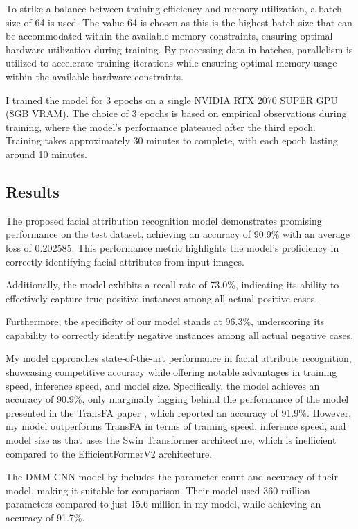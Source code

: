 \documentclass[a4paper,oneside]{article}
\begin{document}
To strike a balance between training efficiency and memory utilization, a batch size of 64 is used.
The value 64 is chosen as this is the highest batch size that can be accommodated within the available memory constraints, ensuring optimal hardware utilization during training.
By processing data in batches, parallelism is utilized to accelerate training iterations while ensuring optimal memory usage within the available hardware constraints.

I trained the model for 3 epochs on a single NVIDIA RTX 2070 SUPER GPU (8GB VRAM).
The choice of 3 epochs is based on empirical observations during training, where the model's performance plateaued after the third epoch.
Training takes approximately 30 minutes to complete, with each epoch lasting around 10 minutes.

\subsection{Results}
\label{sec:subsection_results}

The proposed facial attribution recognition model demonstrates promising performance on the test dataset, achieving an accuracy of 90.9\% with an average loss of 0.202585.
This performance metric highlights the model's proficiency in correctly identifying facial attributes from input images.

Additionally, the model exhibits a recall rate of 73.0\%, indicating its ability to effectively capture true positive instances among all actual positive cases.

Furthermore, the specificity of our model stands at 96.3\%, underscoring its capability to correctly identify negative instances among all actual negative cases.

My model approaches state-of-the-art performance in facial attribute recognition, showcasing competitive accuracy while offering notable advantages in training speed, inference speed, and model size.
Specifically, the model achieves an accuracy of 90.9\%, only marginally lagging behind the performance of the model presented in the TransFA paper \citet{liu2022transfa}, which reported an accuracy of 91.9\%.
However, my model outperforms TransFA in terms of training speed, inference speed, and model size as that uses the Swin Transformer architecture, which is inefficient compared to the EfficientFormerV2 architecture.

The DMM-CNN model by \citet{DBLP:journals/corr/abs-2002-03683} includes the parameter count and accuracy of their model, making it suitable for comparison.
Their model used 360 million parameters compared to just 15.6 million in my model, while achieving an accuracy of 91.7\%.
\end{document}
